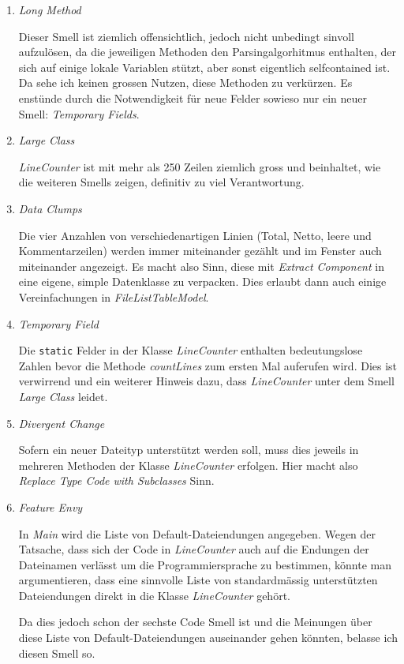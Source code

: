 \documentclass[a4paper]{article}
\newcommand{\java}[1]{\lstinline[style=customjava]{#1}} %
\begin{document}
\begin{enumerate}
	\item \emph{Long Method}

		Dieser Smell ist ziemlich offensichtlich, jedoch nicht
		unbedingt sinvoll aufzul\"osen, da die jeweiligen Methoden den
		Parsingalgorhitmus enthalten, der sich auf einige lokale
		Variablen st\"utzt, aber sonst eigentlich selfcontained ist. Da
		sehe ich keinen grossen Nutzen, diese Methoden zu verk\"urzen.
		Es enst\"unde durch die Notwendigkeit f\"ur neue Felder sowieso
		nur ein neuer Smell: \emph{Temporary Fields}.

	\item \emph{Large Class}

		\emph{LineCounter} ist mit mehr als 250 Zeilen ziemlich gross
		und beinhaltet, wie die weiteren Smells zeigen, definitiv zu
		viel Verantwortung.

	\item \emph{Data Clumps}

		Die vier Anzahlen von verschiedenartigen Linien (Total, Netto,
		leere und Kommentarzeilen) werden immer miteinander gez\"ahlt
		und im Fenster auch miteinander angezeigt. Es macht also Sinn,
		diese mit \emph{Extract Component} in eine eigene, simple
		Datenklasse zu verpacken. Dies erlaubt dann auch einige
		Vereinfachungen in \emph{FileListTableModel}.

	\item \emph{Temporary Field}

		Die \java{static} Felder in der Klasse \emph{LineCounter}
		enthalten bedeutungslose Zahlen bevor die Methode
		\emph{countLines} zum ersten Mal auferufen wird. Dies ist
		verwirrend und ein weiterer Hinweis dazu, dass
		\emph{LineCounter} unter dem Smell \emph{Large Class} leidet.

	\item \emph{Divergent Change}

		Sofern ein neuer Dateityp unterst\"utzt werden soll, muss dies
		jeweils in mehreren Methoden der Klasse \emph{LineCounter}
		erfolgen. Hier macht also \emph{Replace Type Code with
		Subclasses} Sinn.

	\item \emph{Feature Envy}

		In \emph{Main} wird die Liste von Default-Dateiendungen
		angegeben. Wegen der Tatsache, dass sich der Code in
		\emph{LineCounter} auch auf die Endungen der Dateinamen
		verl\"asst um die Programmiersprache zu bestimmen, k\"onnte man
		argumentieren, dass eine sinnvolle Liste von standardm\"assig
		unterst\"utzten Dateiendungen direkt in die Klasse
		\emph{LineCounter} geh\"ort.

		Da dies jedoch schon der sechste Code Smell ist und die
		Meinungen \"uber diese Liste von Default-Dateiendungen
		auseinander gehen k\"onnten, belasse ich diesen Smell so.
\end{enumerate}
\end{document}
